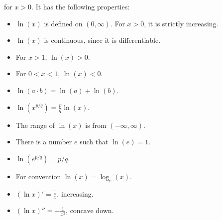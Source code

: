 \begin{itemize}
\begin{equation}
    \end{equation}
    for $x>0$. It has the following properties:
    \begin{itemize}
        \item $\ln(x)$ is defined on $(0,\infty)$. For $x>0$, it is strictly increasing.
        \item $\ln(x)$ is continuous, since it is differentiable.
        \item For $x>1$, $\ln(x)>0$.
        \item For $0<x<1$, $\ln(x)<0$.
        \item $\ln(a\cdot b) = \ln(a)+\ln(b)$.
        \item $\ln(x^{p/q}) = \frac{p}{q}\ln(x)$.
        \item The range of $\ln(x)$ is from $(-\infty,\infty)$.
        \item There is a number $e$ such that $\ln(e)=1$.
        \item $\ln(e^{p/q})=p/q$.
        \item For convention $\ln(x)=\log_e(x)$.
        \item $(\ln x)' = \frac{1}{x}$, increasing.
        \item $(\ln x)'' = -\frac{1}{x^2}$, concave down.
    \end{itemize}
\end{itemize}